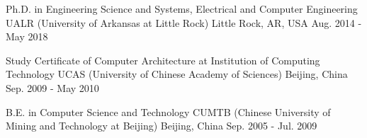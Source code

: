 

\begin{cventries}

%

  \cventry
    {Ph.D. in Engineering Science and Systems, Electrical and Computer Engineering} %
    {UALR (University of Arkansas at Little Rock)} %
    {Little Rock, AR, USA} %
    {Aug. 2014 - May 2018} %
    {
   }

\vspace{-0.25cm}
  \cventry
{Study Certificate of Computer Architecture at Institution of Computing Technology} %
{UCAS (University of Chinese Academy of Sciences)} %
{Beijing, China} %
{Sep. 2009 - May 2010} %
{
}

\vspace{-0.25cm}

\cventry
{B.E. in Computer Science and Technology} %
{CUMTB (Chinese University of Mining and Technology at Beijing)} %
{Beijing, China} %
{Sep. 2005 - Jul. 2009} %
{
}

\vspace{-0.25cm}

\end{cventries}
